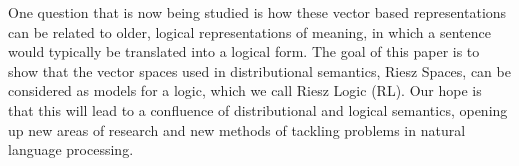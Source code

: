 \documentclass[journal,draftcls,onecolumn]{IEEEtran}
\theoremstyle{definition}
\begin{document}
One question that is now being studied is how these vector based
representations can be related to older, logical representations of
meaning, in which a sentence would typically be translated into a
logical form. The goal of this paper is to show that the vector spaces
used in distributional semantics, Riesz Spaces, can be considered as
models for a logic, which we call Riesz Logic (RL). Our hope is that
this will lead to a confluence of distributional and logical
semantics, opening up new areas of research and new methods of
tackling problems in natural language processing.




\end{document}
